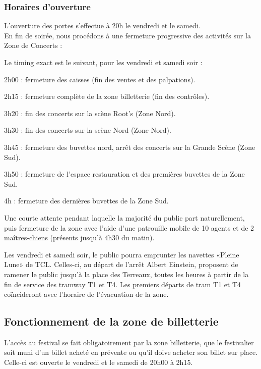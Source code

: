 \documentclass[hidelinks, paper=a4, fontsize=13pt]{report}
\begin{document}
\subsubsection{Horaires d’ouverture}
L'ouverture des portes s'effectue à 20h le vendredi et le samedi.\\

En fin de soirée, nous procédons à une fermeture progressive des activités sur la Zone de Concerts : 

Le timing exact est le suivant, pour les vendredi et samedi soir :
\begin{list}{•}{}
	\item 2h00 : fermeture des caisses (fin des ventes et des palpations).
	\item 2h15 : fermeture complète de la zone billetterie (fin des contrôles). 
	\item 3h20 : fin des concerts sur la scène Root's (Zone Nord).
	\item 3h30 : fin des concerts sur la scène Nord (Zone Nord).
	\item 3h45 : fermeture des buvettes nord, arrêt des concerts sur la Grande Scène (Zone Sud).
	\item 3h50 : fermeture de l'espace restauration et des premières buvettes de la Zone Sud.
	\item 4h : fermeture des dernières buvettes de la Zone Sud.
	\item Une courte attente pendant laquelle la majorité du public part naturellement, puis fermeture de la zone avec l’aide d’une patrouille mobile de 10 agents et de 2 maîtres-chiens (présents jusqu’à 4h30 du matin).
\end{list}

Les vendredi et samedi soir, le public pourra emprunter les navettes «Pleine Lune» de TCL. Celles-ci, au départ de l’arrêt Albert Einstein, proposent de ramener le public jusqu’à la place des Terreaux, toutes les heures à partir de la fin de service des tramway T1 et T4. Les premiers départs de tram T1 et T4 coïncideront avec l'horaire de l'évacuation de la zone.


\subsection{Fonctionnement de la zone de billetterie}

L’accès au festival se fait obligatoirement par la zone billetterie, que le festivalier soit muni d’un billet acheté en prévente ou qu'il doive acheter son billet sur place. Celle-ci est ouverte le vendredi et le samedi de 20h00 à 2h15.\\
\end{document}
